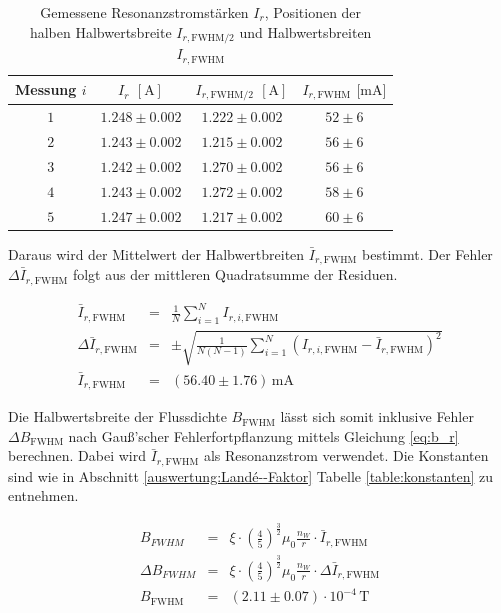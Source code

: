 \documentclass[12pt,a4paper]{scrartcl}
\numberwithin{equation}{section} %
\begin{document}
\begin{table}[h!]
	\centering
	\begin{tabular}{c|c|c|c}
		Messung $i$ & $I_r$ $[\mathrm{A}]$ & $I_{r,\mathrm{FWHM}/2}$ $[\mathrm{A}]$ & $I_{r,\mathrm{FWHM}}$ $[\mathrm{mA]}$ \\
		\hline
		$1$ & $1.248 \pm 0.002$ & $1.222 \pm 0.002$ & $52 \pm 6$ \\
		$2$ & $1.243 \pm 0.002$ & $1.215 \pm 0.002$ & $56 \pm 6$ \\
		$3$ & $1.242 \pm 0.002$ & $1.270 \pm 0.002$ & $56 \pm 6$ \\
		$4$ & $1.243 \pm 0.002$ & $1.272 \pm 0.002$ & $58 \pm 6$ \\
		$5$ & $1.247 \pm 0.002$ & $1.217 \pm 0.002$ & $60 \pm 6$
	\end{tabular}
	\caption{Gemessene Resonanzstromstärken $I_r$, Positionen der\\
		halben Halbwertsbreite $I_{r,\mathrm{FWHM}/2}$ und Halbwertsbreiten $I_{r,\mathrm{FWHM}}$}
	\label{table:halbwertsbreiten}
\end{table}

Daraus wird der Mittelwert der Halbwertbreiten $\bar I_{r,\mathrm{FWHM}}$ bestimmt. Der Fehler $\Delta \bar I_{r,\mathrm{FWHM}}$ folgt aus der mittleren Quadratsumme der Residuen.

\begin{eqnarray}
	\bar I_{r,\mathrm{FWHM}} &=& \frac{1}{N} \sum_{i=1}^{N} I_{r,i,\mathrm{FWHM}}
	\label{eq:fwhmMittel} \\
	\Delta \bar I_{r,\mathrm{FWHM}} &=& \pm\sqrt{\frac{1}{N(N-1)}\sum_{i=1}^{N} (I_{r,i,\mathrm{FWHM}}-\bar I_{r,\mathrm{FWHM}})^2}
	\label{eq:fwhmMittelErr} \\
	\bar I_{r,\mathrm{FWHM}} &=& (56.40 \pm 1.76) \mathrm{\, mA}
\end{eqnarray}

\noindent
Die Halbwertsbreite der Flussdichte $B_\mathrm{FWHM}$ lässt sich somit inklusive Fehler $\Delta B_\mathrm{FWHM}$ nach Gauß'scher Fehlerfortpflanzung mittels Gleichung \eqref{eq:b_r} berechnen. Dabei wird $\bar I_{r,\mathrm{FWHM}}$ als Resonanzstrom verwendet. Die Konstanten sind wie in Abschnitt \ref{auswertung:Landé--Faktor} Tabelle \ref{table:konstanten} zu entnehmen.

\begin{eqnarray}
	B_{FWHM} &=& \xi \cdot \left(\frac{4}{5}\right)^{\frac{3}{2}}\mu _0 \frac{n_W}{r} \cdot \bar I_{r,\mathrm{FWHM}}
	\label{eq:b_fwhm} \\
	\Delta B_{FWHM} &=& \xi \cdot \left(\frac{4}{5}\right)^{\frac{3}{2}}\mu _0 \frac{n_W}{r} \cdot \Delta \bar I_{r,\mathrm{FWHM}} \\
	B_\mathrm{FWHM} &=& (2.11 \pm 0.07) \cdot 10^{-4} \mathrm{\, T}
\end{eqnarray}
\end{document}
